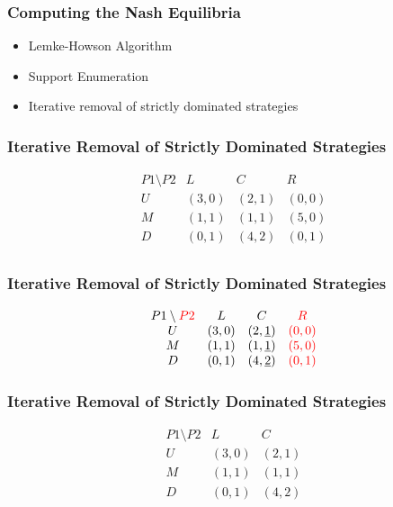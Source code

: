 \begin{frame}
    \frametitle{Computing the Nash Equilibria}
    \begin{itemize}
        \item Lemke-Howson Algorithm
        \item Support Enumeration 
        \item Iterative removal of strictly dominated strategies
    \end{itemize}

\end{frame}


\begin{frame}
    \frametitle{Iterative Removal of Strictly Dominated Strategies}
    \begin{equation*}
        \begin{matrix}
            P1\setminus P2 & L & C & R \\
            U & (3,0) & (2,1) & (0,0) \\
            M & (1,1) & (1,1) & (5,0) \\
            D & (0,1) & (4,2) & (0,1) \\
        \end{matrix}
    \end{equation*}
\end{frame}


\begin{frame}
    \frametitle{Iterative Removal of Strictly Dominated Strategies}
    \begin{equation*}
        \begin{matrix}
            P1\setminus \textcolor{red}{P2} & L & C & \textcolor{red}{R} \\
            U & (3,0) & (2,\underline{1}) & \textcolor{red}{(0,0)} \\
            M & (1,1) & (1,\underline{1}) & \textcolor{red}{(5,0)} \\
            D & (0,1) & (4,\underline{2}) & \textcolor{red}{(0,1)} \\
        \end{matrix}
    \end{equation*}
\end{frame}


\begin{frame}
    \frametitle{Iterative Removal of Strictly Dominated Strategies}
    \begin{equation*}
        \begin{matrix}
            P1\setminus P2 & L & C \\
            U & (3,0) & (2,1) \\
            M & (1,1) & (1,1) \\
            D & (0,1) & (4,2) \\
        \end{matrix}
    \end{equation*}
\end{frame}


